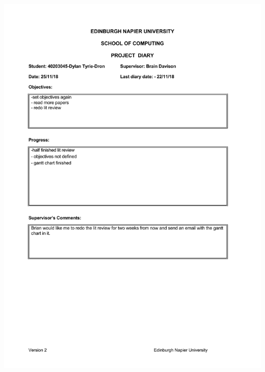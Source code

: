 \documentclass[12pt,a4paper]{article}
\begin{document}
\begin{appendices}
\includegraphics[width=\textwidth,height=\textheight,keepaspectratio]{project_diary_8th_entry.pdf}

\end{appendices}
\end{document}
